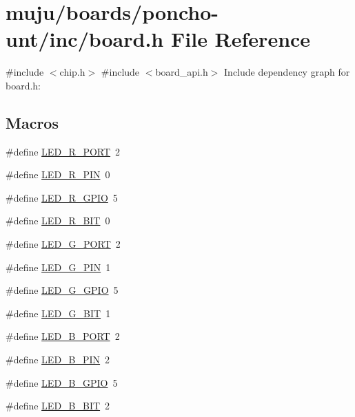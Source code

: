 \hypertarget{poncho-unt_2inc_2board_8h}{}\section{muju/boards/poncho-\/unt/inc/board.h File Reference}
\label{poncho-unt_2inc_2board_8h}
{\ttfamily \#include $<$chip.\+h$>$}\newline
{\ttfamily \#include $<$board\+\_\+api.\+h$>$}\newline
Include dependency graph for board.\+h\+:
\subsection*{Macros}
\begin{DoxyCompactItemize}
\item 
\#define \hyperlink{group__hal_ga5a11a7cbc215e25401541277460113a4}{L\+E\+D\+\_\+\+R\+\_\+\+P\+O\+RT}~2
\item 
\#define \hyperlink{group__hal_ga22f3cf4ef9dadad8d78d5c59999100b6}{L\+E\+D\+\_\+\+R\+\_\+\+P\+IN}~0
\item 
\#define \hyperlink{group__hal_ga938c5edc31fe4ba21d42ac85c739bc9b}{L\+E\+D\+\_\+\+R\+\_\+\+G\+P\+IO}~5
\item 
\#define \hyperlink{group__hal_ga770cf8cc93e5ceb6b347f655d5425f03}{L\+E\+D\+\_\+\+R\+\_\+\+B\+IT}~0
\item 
\#define \hyperlink{group__hal_ga1ef377b425c83109ec7998dc6fa71345}{L\+E\+D\+\_\+\+G\+\_\+\+P\+O\+RT}~2
\item 
\#define \hyperlink{group__hal_ga3d793023ce3cf36a952b0b68ab1a389a}{L\+E\+D\+\_\+\+G\+\_\+\+P\+IN}~1
\item 
\#define \hyperlink{group__hal_gab4f388402d4d678445fee6617f96128d}{L\+E\+D\+\_\+\+G\+\_\+\+G\+P\+IO}~5
\item 
\#define \hyperlink{group__hal_gae425f2df67fc802fcf8a442a57a92c81}{L\+E\+D\+\_\+\+G\+\_\+\+B\+IT}~1
\item 
\#define \hyperlink{group__hal_ga24baefd05a8dea1a7241e288a735c17c}{L\+E\+D\+\_\+\+B\+\_\+\+P\+O\+RT}~2
\item 
\#define \hyperlink{group__hal_gac210a43d7fede956117cfb90baff9511}{L\+E\+D\+\_\+\+B\+\_\+\+P\+IN}~2
\item 
\#define \hyperlink{group__hal_ga91901ef42fb89387a433e685cb3f8745}{L\+E\+D\+\_\+\+B\+\_\+\+G\+P\+IO}~5
\item 
\#define \hyperlink{group__hal_ga50b5b18af7a51f83133cb0ad51380c7d}{L\+E\+D\+\_\+\+B\+\_\+\+B\+IT}~2

\end{DoxyCompactItemize}

